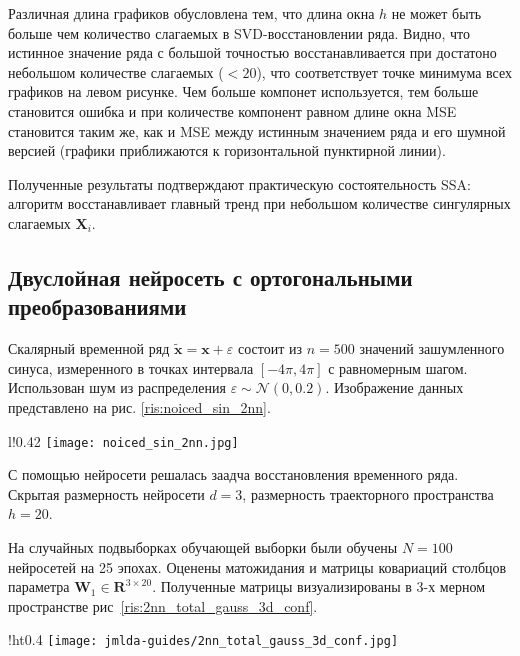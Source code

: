 \documentclass[12pt, twoside]{article}
\begin{document}
Различная длина графиков обусловлена тем, что длина окна $h$ не может быть больше чем количество слагаемых в SVD-восстановлении ряда. Видно, что истинное значение ряда с большой точностью восстанавливается при достатоно небольшом количестве слагаемых ($<20$), что соответствует точке минимума всех графиков на левом рисунке. Чем больше компонет используется, тем больше становится ошибка и при количестве компонент равном длине окна MSE становится таким же, как и MSE между истинным значением ряда и его шумной версией (графики приближаются к горизонтальной пунктирной линии).


Полученные результаты подтверждают практическую состоятельность SSA: алгоритм восстанавливает главный тренд при небольшом количестве сингулярных слагаемых $\mathbf{X}_i$.


\subsection{Двуслойная нейросеть с ортогональными преобразованиями}
Скалярный временной ряд $\mathbf{\tilde{x}} = \mathbf{x} + \varepsilon$ состоит из $n=500$ значений зашумленного синуса, измеренного в точках интервала $[-4\pi, 4\pi]$ с равномерным шагом. Использован шум из распределения $\varepsilon \sim \mathcal{N}(0, 0.2)$. Изображение данных представлено на рис. \ref{ris:noiced_sin_2nn}.

\begin{wrapfigure}{l!}{0.42\textwidth}
\texttt{[image: noiced\_sin\_2nn.jpg]}
\caption{Зашумленный синус.}
\label{ris:noiced_sin_2nn}
\end{wrapfigure}

С помощью нейросети решалась заадча восстановления временного ряда. Скрытая размерность нейросети $d=3$, размерность траекторного пространства $h=20$.

На случайных подвыборках обучающей выборки были обучены $N=100$ нейросетей на 25 эпохах. Оценены матожидания и матрицы ковариаций столбцов параметра $\mathbf{W}_1 \in \mathbf{R}^{3 \times 20}$. Полученные матрицы визуализированы в 3-х мерном пространстве рис~\ref{ris:2nn_total_gauss_3d_conf}.

\newpage

\begin{wrapfigure}{!ht}{0.4\textwidth}
\texttt{[image: jmlda-guides/2nn\_total\_gauss\_3d\_conf.jpg]}
\caption{Доверительные области 3-х мерных векторов двуслойной нейросети арихитектуры 20-3-20.}
\label{ris:2nn_total_gauss_3d_conf}
\end{wrapfigure}
\end{document}
